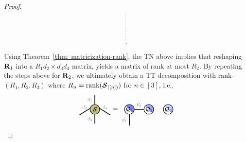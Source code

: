 \begin{proof}
$$\begin{tikzpicture}
    \draw[dotted](\x+1.5,\y+0.75) -- (\x+1.5,\y-0.75);
\end{tikzpicture}.
$$
Using Theorem~\ref{thm: matricization-rank}, the TN above implies that reshaping $\mathbf{R}_1$ into a $R_1d_2\times d_3d_4$
matrix, yields a matrix of rank at most $R_2$.
By repeating the steps above for $\mathbf{R}_2$, we ultimately obtain a TT decomposition with  rank-$(R_1,R_2,R_3)$ where $R_n = \mathrm{rank}{(\bm{\mathcal{S}}_{([n])})}$ for $n\in [3]$, i.e.,
\begin{align}\label{eq:tt-format}
    \begin{tikzpicture}[baseline=\baseline]
    \tikzset{tensor/.style = {minimum size = 0.5cm,shape = circle,thick,draw=black,inner sep = 0pt}, edge/.style = {thick,line width=.4mm},every loop/.style={}}
    \def\y{0}
    \def\x{0}
    \node[tensor,fill=green!50!red!50!white] (S) at (\x,\y){\scalebox{0.85}{$\St$}};
    \draw[edge] (S) -- (\x,\y+0.75) node [midway,left]
    {\scalebox{0.7}{\dimcolor{$d_1$}}};
    \draw[edge] (S) -- (\x,\y-0.75) node [midway,left]
    {\scalebox{0.7}{\dimcolor{$d_3$}}};
    \draw[edge] (\x+0.25,\y+0.05) -- (\x+0.8,\y-0.3) node [midway,above]
    {\scalebox{0.7}{\dimcolor{$d_4$}}};
    \draw[edge] (\x-0.25,\y+0.05) -- (\x-0.8,\y-0.3) node [midway,above]
    {\scalebox{0.7}{\dimcolor{$d_2$}}};
\end{tikzpicture}
=
\begin{tikzpicture}[baseline=\baseline]
    \tikzset{tensor/.style = {minimum size = 0.5cm,shape = circle,thick,draw=black,inner sep = 0pt}, edge/.style = {thick,line width=.4mm},every loop/.style={}}
    \def\y{0}
    \def\x{0}
    \node[tensor, path picture={
    \fill[fill=blue!50!white](path picture bounding box.south east)
        -- 
    (path picture bounding box.north west) --
    (path picture bounding box.north east) -- cycle;
    }, shift={(\x,\y)}] (Q_1) {\scalebox{0.8}{$\Qt_1$}};
    \node[tensor, path picture={
    \fill[fill=blue!35!white](path picture bounding box.south east)
        -- 
    (path picture bounding box.north west) --
    (path picture bounding box.north east) -- cycle;
    }, shift={(\x+1,\y)}] (Q_2) {\scalebox{0.8}{$\Qt_2$}};
    \node[tensor, path picture={
    \fill[fill=blue!20!white](path picture bounding box.south east)
        -- 
    (path picture bounding box.north west) --
    (path picture bounding box.north east) -- cycle;
    }, shift={(\x+2,\y)}] (Q_3) {\scalebox{0.8}{$\Qt_3$}};
    \draw[edge](Q_1) -- (Q_2)node [midway,above]  {\scalebox{0.7}{\dimcolor{$R_1$}}};
    \draw[edge](Q_1) -- (\x,\y-0.85)node [midway,left]  {\scalebox{0.7}{\dimcolor{$d_1$}}};

\end{tikzpicture}
\end{align}
\end{proof}
